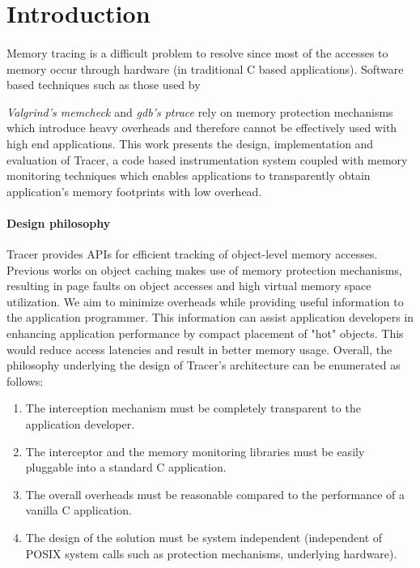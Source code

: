 \section{Introduction} 
\label{sec:intro}
\paragraph{}
Memory tracing is a difficult problem to resolve since most of the accesses to memory occur through hardware (in traditional C based applications). Software based techniques such as those used by {\emph{Valgrind's memcheck \cite{nethercote2007valgrind}} and {\emph{gdb's ptrace}} \cite{gdb} rely on memory protection mechanisms which introduce heavy overheads and therefore cannot be effectively used with high end applications. This work presents the design, implementation and evaluation of Tracer, a code based instrumentation system coupled with memory monitoring techniques which enables applications to transparently obtain application's memory footprints with low overhead. 

\paragraph{Design philosophy}
Tracer provides APIs for efficient tracking of object-level memory accesses. Previous works on object caching makes use of memory protection mechanisms, resulting in page faults on object accesses and high virtual memory space utilization. We aim to minimize overheads while providing useful information to the application programmer. This information can assist application developers in enhancing application performance by compact placement of "hot" objects. This would reduce access latencies and result in better memory usage. Overall, the philosophy underlying the design of Tracer's architecture can be enumerated as follows:
\begin{enumerate}
\item The interception mechanism must be completely transparent to the application developer.
\item The interceptor and the memory monitoring libraries must be easily pluggable into a standard C application.
\item The overall overheads must be reasonable compared to the performance of a vanilla C application.
\item The design of the solution must be system independent (independent of POSIX system calls such as protection mechanisms, underlying hardware).
\end{enumerate}

}
